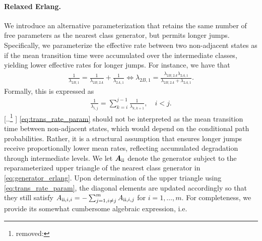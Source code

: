 \documentclass{article}
\newcommand{\myparagraph}[1]{\paragraph{#1}\mbox{}\\}
\newcommand{\RN}[1]{\textup{\uppercase\expandafter{\romannumeral#1}}}
\providecommand{\DIFadd}[1]{{\protect\color{blue} \sf #1}} %
\providecommand{\DIFdel}[1]{{\protect\color{red} [..\footnote{removed: #1} ]}} %
\providecommand{\DIFaddbegin}{} %
\providecommand{\DIFaddend}{} %
\providecommand{\DIFdelbegin}{} %
\providecommand{\DIFdelend}{} %
\begin{document}
\DIFdelbegin %
\DIFdelend \DIFaddbegin \paragraph{\DIFadd{Relaxed Erlang.}} 
\DIFaddend We introduce an alternative parameterization that retains the same number of free parameters as the nearest class generator, but permits longer jumps. %
Specifically, we parameterize the effective rate between two non-adjacent states as if the mean transition time were accumulated over the intermediate classes, yielding lower effective rates for longer jumps.
For instance, we have that
\begin{align*}
    \frac{1}{\lambda_{2B, 1}} = \frac{1}{\lambda_{2B, 2A}} + \frac{1}{\lambda_{2A, 1}}
    \iff \lambda_{2B,1} = \frac{\lambda_{2B, 2A} \lambda_{2A, 1}}{\lambda_{2B, 2A} + \lambda_{2A, 1}}. 
\end{align*}
Formally, this is expressed as
\begin{align}
    \frac{1}{\lambda_{i,j}} = \sum_{k = i}^{j-1} \frac{1}{\lambda_{k,k+1}}, \quad i < j. \label{eq:trans_rate_param}
\end{align}
\DIFdelbegin \DIFdel{ }\DIFdelend \DIFaddbegin \DIFadd{\cref{eq:trans_rate_param} }\DIFaddend should not be interpreted as the mean transition time between non-adjacent states, which would depend on the conditional path probabilities. Rather, it is a structural assumption that ensures longer jumps receive proportionally lower mean rates, reflecting accumulated degradation through intermediate levels.
We let $\bm{A}_{\RN{2}}$ denote the generator subject to the reparameterized upper triangle of the nearest class generator in \cref{eq:generator_erlang}.
Upon determination of the upper triangle using \cref{eq:trans_rate_param}, the diagonal elements are updated accordingly so that they still satisfy $A_{\RN{2},i,i}= -\sum_{j=1, i \neq j}^m A_{\RN{2},i,j}$ for $i = 1, \dots, m$. For completeness, we provide its somewhat cumbersome algebraic expression, i.e.
\end{document}
